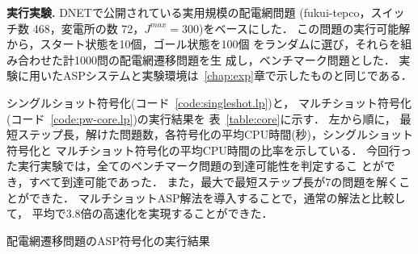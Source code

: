\textbf{実行実験.}
%
DNETで公開されている実用規模の配電網問題
({\sf fukui-tepco}，スイッチ数 468，変電所の数 72，$J^{max}=300$)をベースにした．
この問題の実行可能解から，スタート状態を10個，ゴール状態を100個
をランダムに選び，それらを組み合わせた計1000問の配電網遷移問題を生
成し，ベンチマーク問題とした．
実験に用いたASPシステムと実験環境は~\ref{chap:exp}章で示したものと同じである．

シングルショット符号化(コード~\ref{code:singleshot.lp})と，
マルチショット符号化(コード~\ref{code:pw-core.lp})の実行結果を
表~\ref{table:core}に示す．
左から順に，
最短ステップ長，解けた問題数，各符号化の平均CPU時間(秒)，シングルショット符号化と
マルチショット符号化の平均CPU時間の比率を示している．
今回行った実行実験では，全てのベンチマーク問題の到達可能性を判定するこ
とができ，すべて到達可能であった．
また，最大で最短ステップ長が7の問題を解くことができた．
マルチショットASP解法を導入することで，通常の解法と比較して，
平均で3.8倍の高速化を実現することができた．

\begin{table*}[t]
  \centering
  \caption{配電網遷移問題のASP符号化の実行結果}
  \label{table:core}
  
\end{table*}


